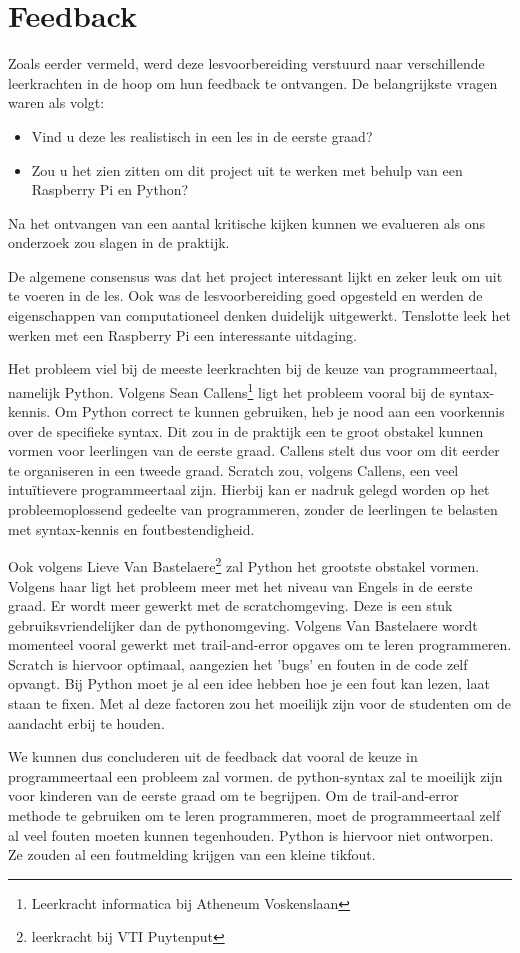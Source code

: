 \section{Feedback}
Zoals eerder vermeld, werd deze lesvoorbereiding verstuurd naar verschillende leerkrachten in de hoop om hun feedback te ontvangen.
De belangrijkste vragen waren als volgt:
\begin{itemize}
    \item Vind u deze les realistisch in een les in de eerste graad?
    \item Zou u het zien zitten om dit project uit te werken met behulp van een Raspberry Pi en Python?
\end{itemize}
Na het ontvangen van een aantal kritische kijken kunnen we evalueren als ons onderzoek zou slagen in de praktijk. 

De algemene consensus was dat het project interessant lijkt en zeker leuk om uit te voeren in de les. Ook was de lesvoorbereiding goed opgesteld en werden de eigenschappen van computationeel denken duidelijk uitgewerkt. Tenslotte leek het werken met een Raspberry Pi een interessante uitdaging. 

Het probleem viel bij de meeste leerkrachten bij de keuze van programmeertaal, namelijk Python.
Volgens Sean Callens\footnote{Leerkracht informatica bij Atheneum Voskenslaan} ligt het probleem vooral bij de syntax-kennis. Om Python correct te kunnen gebruiken, heb je nood aan een voorkennis over de specifieke syntax. Dit zou in de praktijk een te groot obstakel kunnen vormen voor leerlingen van de eerste graad. Callens stelt dus voor om dit eerder te organiseren in een tweede graad. Scratch zou, volgens Callens, een veel intuïtievere programmeertaal zijn. Hierbij kan er nadruk gelegd worden op het probleemoplossend gedeelte van programmeren, zonder de leerlingen te belasten met syntax-kennis en foutbestendigheid. 

Ook volgens Lieve Van Bastelaere\footnote{leerkracht bij VTI Puytenput} zal Python het grootste obstakel vormen. Volgens haar ligt het probleem meer met het niveau van Engels in de eerste graad. Er wordt meer gewerkt met de scratchomgeving. Deze is een stuk gebruiksvriendelijker dan de pythonomgeving. Volgens Van Bastelaere wordt momenteel vooral gewerkt met trail-and-error opgaves om te leren programmeren. Scratch is hiervoor optimaal, aangezien het 'bugs' en fouten in de code zelf opvangt. Bij Python moet je al een idee hebben hoe je een fout kan lezen, laat staan te fixen. Met al deze factoren zou het moeilijk zijn voor de studenten om de aandacht erbij te houden.


We kunnen dus concluderen uit de feedback dat vooral de keuze in programmeertaal een probleem zal vormen. de python-syntax zal te moeilijk zijn voor kinderen van de eerste graad om te begrijpen. Om de trail-and-error methode te gebruiken om te leren programmeren, moet de programmeertaal zelf al veel fouten moeten kunnen tegenhouden. Python is hiervoor niet ontworpen. Ze zouden al een foutmelding krijgen van een kleine tikfout.